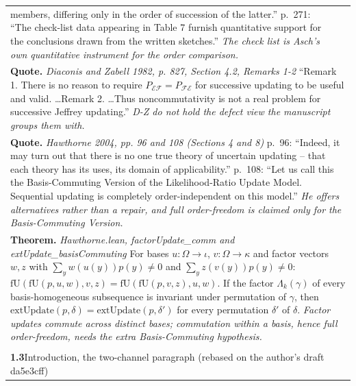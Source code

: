 \documentclass[10pt]{article}
\theoremstyle{definition}
\newlength{\fullw}\setlength{\fullw}{25.9cm}
\newcommand{\entryhead}[2]{\multicolumn{3}{|l|}{\rule{0pt}{2.6ex}\large\textbf{#1}\quad #2} \\ \hline}
\begin{document}
{\begin{longtable}{|p{0.9cm}|p{12.2cm}|p{12.2cm}|}
{members, differing only in the order of succession of the latter.''
p.~271: ``The check-list data appearing in Table 7 furnish quantitative
support for the conclusions drawn from the written sketches.'' \newline \textit{The check list is Asch's own quantitative instrument for the
order comparison.}} \\
\multicolumn{3}{|p{\fullw}|}{\textbf{Quote.} \textit{Diaconis and Zabell 1982, p. 827, Section 4.2, Remarks 1-2} \newline ``Remark 1. There is no reason to require
$P_{\mathcal{E}\mathcal{F}} = P_{\mathcal{F}\mathcal{E}}$ for successive
updating to be useful and valid. \ldots Remark 2. \ldots Thus noncommutativity
is not a real problem for successive Jeffrey updating.'' \newline \textit{D-Z do not hold the defect view the manuscript groups them with.}} \\
\multicolumn{3}{|p{\fullw}|}{\textbf{Quote.} \textit{Hawthorne 2004, pp. 96 and 108 (Sections 4 and 8)} \newline p.~96: ``Indeed, it may turn out that there is no one true theory of
uncertain updating -- that each theory has its uses, its domain of
applicability.'' p.~108: ``Let us call this the Basis-Commuting Version of the
Likelihood-Ratio Update Model. Sequential updating is completely
order-independent on this model.'' \newline \textit{He offers alternatives rather than a repair, and full order-freedom
is claimed only for the Basis-Commuting Version.}} \\
\multicolumn{3}{|p{\fullw}|}{\textbf{Theorem.} \textit{Hawthorne.lean, factorUpdate\_comm and extUpdate\_basisCommuting} \newline For bases $u:\Omega\to\iota$, $v:\Omega\to\kappa$ and factor vectors
$w,z$ with $\sum_y w(u(y))p(y)\neq0$ and $\sum_y z(v(y))p(y)\neq0$:
$\mathrm{fU}(\mathrm{fU}(p,u,w),v,z) = \mathrm{fU}(\mathrm{fU}(p,v,z),u,w)$. If the
factor $\Lambda_k(\gamma)$ of every basis-homogeneous subsequence is invariant
under permutation of $\gamma$, then $\mathrm{extUpdate}(p,\delta) =
\mathrm{extUpdate}(p,\delta')$ for every permutation $\delta'$ of $\delta$. \newline \textit{Factor updates commute across distinct bases; commutation within a
basis, hence full order-freedom, needs the extra Basis-Commuting hypothesis.}} \\ \hline
\multicolumn{3}{|l|}{} \\ \hline
\entryhead{1.3}{Introduction, the two-channel paragraph (rebased on the author's draft da5e3cff)\quad{\footnotesize\textit{(formerly C.4)}}}

\end{longtable}}
\end{document}
